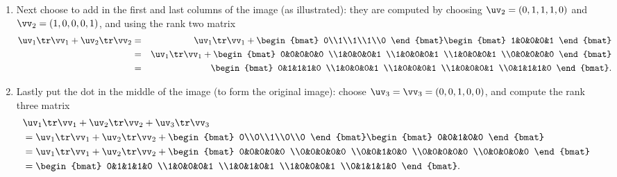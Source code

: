 \begin{example}
\begin{solution}
\begin{enumerate}
\item Next choose to add in the first and last columns of the image (as illustrated): they are computed by choosing  \(\uv_2=(0,1,1,1,0)\) and \(\vv_2=(1,0,0,0,1)\), and using the rank two matrix
\marginpar{}
\begin{eqnarray*}
\uv_1\tr\vv_1+\uv_2\tr\vv_2
&=&\uv_1\tr\vv_1+\begin{bmat} 0\\1\\1\\1\\0 \end{bmat}
\begin{bmat} 1&0&0&0&1 \end{bmat}
\\&=&\uv_1\tr\vv_1+\begin{bmat} 0&0&0&0&0
\\1&0&0&0&1
\\1&0&0&0&1
\\1&0&0&0&1
\\0&0&0&0&0 \end{bmat}
\\&=&\begin{bmat} 0&1&1&1&0
\\1&0&0&0&1
\\1&0&0&0&1
\\1&0&0&0&1
\\0&1&1&1&0 \end{bmat}.
\end{eqnarray*}

\item Lastly put the dot in the middle of the image (to form the original image): choose  \(\uv_3=\vv_3=(0,0,1,0,0)\), and compute the rank three matrix
\begin{align*}
&\uv_1\tr\vv_1+\uv_2\tr\vv_2+\uv_3\tr\vv_3
\\&=\uv_1\tr\vv_1+\uv_2\tr\vv_2
+\begin{bmat} 0\\0\\1\\0\\0 \end{bmat}
\begin{bmat} 0&0&1&0&0 \end{bmat}
\\&=\uv_1\tr\vv_1+\uv_2\tr\vv_2+\begin{bmat} 0&0&0&0&0
\\0&0&0&0&0
\\0&0&1&0&0
\\0&0&0&0&0
\\0&0&0&0&0 \end{bmat}
\\&=\begin{bmat} 0&1&1&1&0
\\1&0&0&0&1
\\1&0&1&0&1
\\1&0&0&0&1
\\0&1&1&1&0 \end{bmat}.
\end{align*}


\end{enumerate}
\end{solution}
\end{example}
